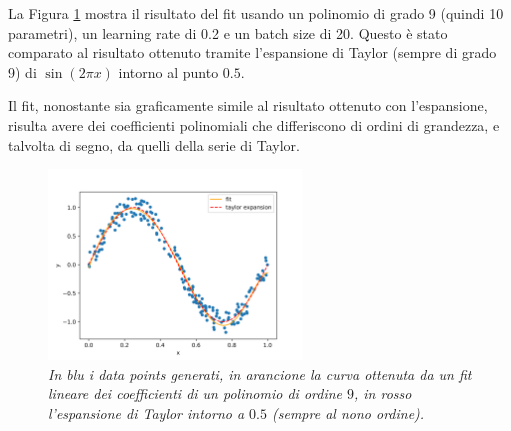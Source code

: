 \documentclass{article}
\begin{document}
La Figura \ref{fig:sin_fit} mostra il risultato del fit usando un polinomio di grado 9 (quindi 10 parametri), un learning rate di 0.2 e un batch size di 20. Questo è stato comparato al risultato ottenuto tramite l'espansione di Taylor (sempre di grado 9) di $\sin(2 \pi x)$ intorno al punto $0.5$. 

Il fit, nonostante sia graficamente simile al risultato ottenuto con l'espansione, risulta avere dei coefficienti polinomiali che differiscono di ordini di grandezza, e talvolta di segno, da quelli della serie di Taylor.

\begin{figure}[htbp]
     \centering
     \includegraphics[width = 0.6\textwidth]{./../images/sine_fit.png}
    \caption{\emph{In blu i data points generati, in arancione la curva ottenuta da un fit lineare dei coefficienti di un polinomio di ordine $9$, in rosso l'espansione di Taylor intorno a $0.5$ (sempre al nono ordine).}}
    \label{fig:sin_fit}
\end{figure}
\end{document}
